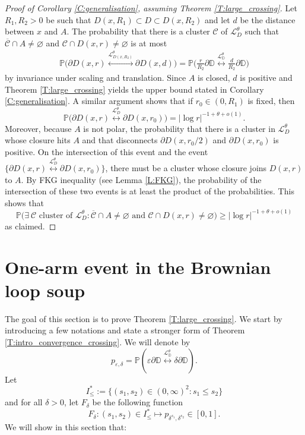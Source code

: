 \documentclass[11pt]{article}
\theoremstyle{remark}
\newcommand{\D}{\mathbb{D}}
\newcommand{\Cc}{\mathcal{C}}
\newcommand{\Lc}{\mathcal{L}}
\newcommand{\Prob}[1]{\mathbb{P} \left( #1 \right) }
\renewcommand{\P}{\mathbb{P}}
\newcommand{\eps}{\varepsilon}
\numberwithin{equation}{section}
\begin{document}
\begin{proof}[Proof of Corollary \ref{C:generalisation}, assuming Theorem \ref{T:large_crossing}]
Let $R_1, R_2 >0$ be such that $D(x,R_1) \subset D \subset D(x,R_2)$ and let $d$ be the distance between $x$ and $A$. The probability that there is a cluster $\Cc$ of $\Lc_D^\theta$ such that $\overline{\Cc} \cap A \neq \varnothing$ and $\Cc \cap D(x,r) \neq \varnothing$ is at most
\begin{align*}
\P \Big( \partial D(x,r) \overset{\Lc_{D(x,R_2)}^\theta}{\longleftrightarrow} \partial D(x,d) \Big)
= \P \Big( \frac{r}{R_2} \partial \D \overset{\Lc_\D^\theta}{\longleftrightarrow} \frac{d}{R_2} \partial \D \Big)
\end{align*}
by invariance under scaling and translation. Since $A$ is closed, $d$ is positive and Theorem \ref{T:large_crossing} yields the upper bound stated in Corollary \ref{C:generalisation}. A similar argument shows that if $r_0 \in (0,R_1)$ is fixed, then
\[
\P \Big( \partial D(x,r) \overset{\Lc_D^\theta}{\longleftrightarrow} \partial D(x,r_0) \Big) = |\log r|^{-1+ \theta +o(1)}.
\]
Moreover, because $A$ is not polar, the probability that there is a cluster in $\Lc_D^\theta$ whose closure hits $A$ and that disconnects $\partial D(x,r_0/2)$ and $\partial D(x,r_0)$ is positive. On the intersection of this event and the event $\{ \partial D(x,r) \overset{\Lc_D^\theta}{\longleftrightarrow} \partial D(x,r_0) \}$, there must be a cluster whose closure joins $D(x,r)$ to $A$. By FKG inequality (see Lemma \ref{L:FKG}), the probability of the intersection of these two events is at least the product of the probabilities. This shows that
\[
\P \Big( \exists ~\Cc \text{~cluster~of~} \Lc_D^\theta: \overline{\Cc} \cap A \neq \varnothing \text{~and~} \Cc \cap D(x,r) \neq \varnothing \Big) \geq |\log r|^{-1+ \theta +o(1)}
\]
as claimed.
\end{proof}




\section{One-arm event in the Brownian loop soup}\label{S:crossing}

The goal of this section is to prove Theorem \ref{T:large_crossing}. We start by introducing a few notations and state a stronger form of Theorem \ref{T:intro_convergence_crossing}.
We will denote by
\[
p_{\eps, \delta} = \Prob{ \eps \partial \D \overset{\Lc_\D^\theta}{\longleftrightarrow}  \delta \partial \D }.
\]
Let
\begin{equation}
\label{E:setI}
I_\leq^* := \{ (s_1,s_2) \in (0,\infty)^2: s_1 \leq s_2 \}
\end{equation}
and for all $\delta>0$, let $F_\delta$ be the following function
\[
F_\delta : (s_1,s_2) \in I_\leq^* \mapsto p_{\delta^{s_1}, \delta^{s_2}} \in [0,1].
\]
We will show in this section that:
\end{document}
